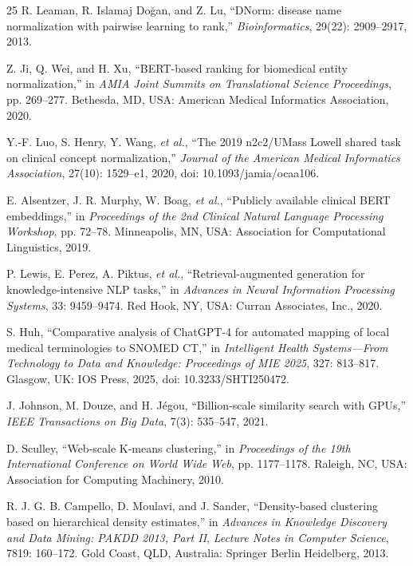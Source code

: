 \begin{thebibliography}{25}
R. Leaman, R. Islamaj Do\u{g}an, and Z. Lu, ``DNorm: disease name normalization with pairwise learning to rank,'' \emph{Bioinformatics}, 29(22): 2909--2917, 2013.

Z. Ji, Q. Wei, and H. Xu, ``BERT-based ranking for biomedical entity normalization,'' in \emph{AMIA Joint Summits on Translational Science Proceedings}, pp. 269--277. Bethesda, MD, USA: American Medical Informatics Association, 2020.

Y.-F. Luo, S. Henry, Y. Wang, \emph{et al.}, ``The 2019 n2c2/UMass Lowell shared task on clinical concept normalization,'' \emph{Journal of the American Medical Informatics Association}, 27(10): 1529--e1, 2020, doi: 10.1093/jamia/ocaa106.

E. Alsentzer, J. R. Murphy, W. Boag, \emph{et al.}, ``Publicly available clinical BERT embeddings,'' in \emph{Proceedings of the 2nd Clinical Natural Language Processing Workshop}, pp. 72--78. Minneapolis, MN, USA: Association for Computational Linguistics, 2019.

P. Lewis, E. Perez, A. Piktus, \emph{et al.}, ``Retrieval-augmented generation for knowledge-intensive NLP tasks,'' in \emph{Advances in Neural Information Processing Systems}, 33: 9459--9474. Red Hook, NY, USA: Curran Associates, Inc., 2020.

S. Huh, ``Comparative analysis of ChatGPT-4 for automated mapping of local medical terminologies to SNOMED CT,'' in \emph{Intelligent Health Systems---From Technology to Data and Knowledge: Proceedings of MIE 2025}, 327: 813--817. Glasgow, UK: IOS Press, 2025, doi: 10.3233/SHTI250472.

J. Johnson, M. Douze, and H. J\'egou, ``Billion-scale similarity search with GPUs,'' \emph{IEEE Transactions on Big Data}, 7(3): 535--547, 2021.

D. Sculley, ``Web-scale K-means clustering,'' in \emph{Proceedings of the 19th International Conference on World Wide Web}, pp. 1177--1178. Raleigh, NC, USA: Association for Computing Machinery, 2010.

R. J. G. B. Campello, D. Moulavi, and J. Sander, ``Density-based clustering based on hierarchical density estimates,'' in \emph{Advances in Knowledge Discovery and Data Mining: PAKDD 2013, Part II}, \emph{Lecture Notes in Computer Science}, 7819: 160--172. Gold Coast, QLD, Australia: Springer Berlin Heidelberg, 2013.


\end{thebibliography}
